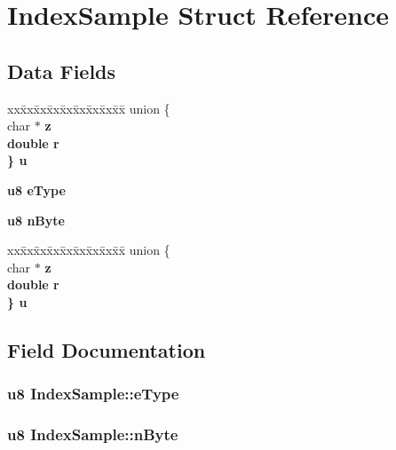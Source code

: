 \section{Index\-Sample Struct Reference}
\label{structIndexSample}
\subsection*{Data Fields}
\begin{CompactItemize}
\item 
\begin{tabbing}
xx\=xx\=xx\=xx\=xx\=xx\=xx\=xx\=xx\=\kill
union \{\\
\>char $\ast$ \bf{z}\\
\>double \bf{r}\\
\} \bf{u}\\

\end{tabbing}\item 
\bf{u8} \bf{e\-Type}
\item 
\bf{u8} \bf{n\-Byte}
\item 
\begin{tabbing}
xx\=xx\=xx\=xx\=xx\=xx\=xx\=xx\=xx\=\kill
union \{\\
\>char $\ast$ \bf{z}\\
\>double \bf{r}\\
\} \bf{u}\\

\end{tabbing}\end{CompactItemize}


\subsection{Field Documentation}
\subsubsection{\setlength{\rightskip}{0pt plus 5cm}\bf{u8} \bf{Index\-Sample::e\-Type}}\label{structIndexSample_443ffc19729474347fc2bca2d75ac722}


\subsubsection{\setlength{\rightskip}{0pt plus 5cm}\bf{u8} \bf{Index\-Sample::n\-Byte}}\label{structIndexSample_2da054ad4a7d817a19f3f524c7c82f3e}



